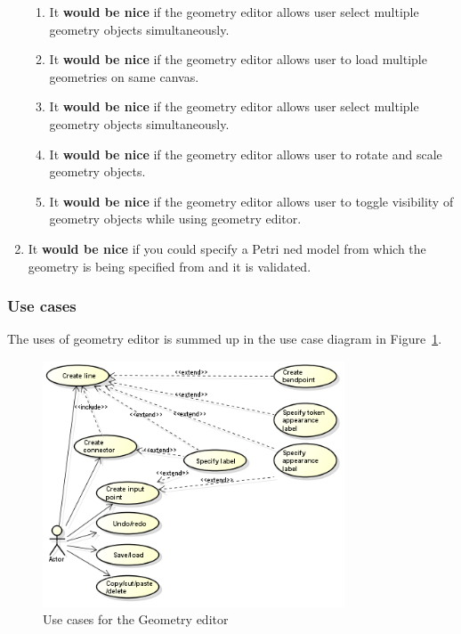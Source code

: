 \begin{enumerate}
\begin{enumerate}
		\item It \textbf{would be nice} if the geometry editor allows user select multiple geometry objects simultaneously.
		\item It \textbf{would be nice} if the geometry editor allows user to load multiple geometries on same canvas.
		\item It \textbf{would be nice} if the geometry editor allows user select multiple geometry objects simultaneously.
		\item It \textbf{would be nice} if the geometry editor allows user to rotate and scale geometry objects.
		\item It \textbf{would be nice} if the geometry editor allows user to toggle visibility of geometry objects while using geometry editor.
	\end{enumerate}
	\item It \textbf{would be nice} if you could specify a Petri ned model from which the geometry is being specified from and it is validated.
\end{enumerate}

\subsubsection{Use cases}

The uses of geometry editor is summed up in the use case diagram in Figure~\ref{fig:use-cases-geometry-editor}.

\begin{figure}[htp]
\begin{center}
  \includegraphics[width=0.8\textwidth]{image/uc-geometry.png}
  \caption{Use cases for the Geometry editor}
  \label{fig:use-cases-geometry-editor}
\end{center}
\end{figure}